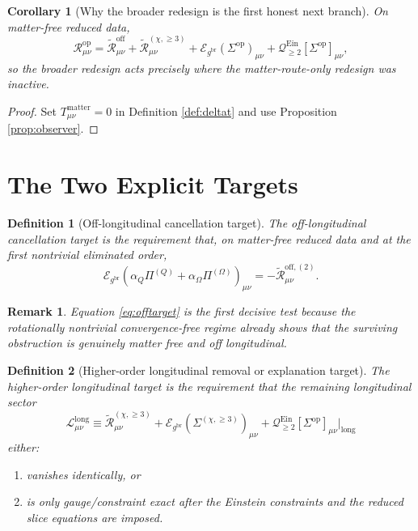\documentclass[11pt]{article}
\newcommand{\ReBridge}{g^{\mathrm{br}}}
\newcommand{\PiQ}{\Pi^{(Q)}}
\newcommand{\PiOmega}{\Pi^{(\Omega)}}
\newcommand{\SigmaOp}{\Sigma^{\mathrm{op}}}
\newcommand{\SigmaLong}{\Sigma^{(\chi,\ge 3)}}
\newcommand{\ReLong}{\widetilde{\mathcal R}_{\mu\nu}^{(\chi,\ge 3)}}
\newcommand{\ReOff}{\widetilde{\mathcal R}_{\mu\nu}^{\mathrm{off}}}
\newcommand{\ReOffTwo}{\widetilde{\mathcal R}_{\mu\nu}^{\mathrm{off},(2)}}
\newcommand{\EinLin}{\mathcal E_{\ReBridge}}
\newcommand{\EinQuad}{\mathcal Q_{\ge 2}^{\mathrm{Ein}}}
\newtheorem{definition}{Definition}
\newtheorem{remark}{Remark}
\newtheorem{corollary}{Corollary}
\begin{document}
\begin{corollary}[Why the broader redesign is the first honest next branch]
\label{cor:honest}
On matter-free reduced data,
\begin{equation}
\mathcal R_{\mu\nu}^{\mathrm{op}}
=
\ReOff+\ReLong
+\EinLin(\SigmaOp)_{\mu\nu}
+\EinQuad[\SigmaOp]_{\mu\nu},
\label{eq:matterfreeobs}
\end{equation}
so the broader redesign acts precisely where the matter-route-only redesign was inactive.
\end{corollary}

\begin{proof}
Set \(T_{\mu\nu}^{\mathrm{matter}}=0\) in Definition \ref{def:deltat} and use Proposition \ref{prop:observer}.
\end{proof}

\section{The Two Explicit Targets}

\begin{definition}[Off-longitudinal cancellation target]
\label{def:offtarget}
The \emph{off-longitudinal cancellation target} is the requirement that, on matter-free reduced data and at the first nontrivial eliminated order,
\begin{equation}
\EinLin(\alpha_Q\PiQ+\alpha_\Omega\PiOmega)_{\mu\nu}
=
-\ReOffTwo.
\label{eq:offtarget}
\end{equation}
\end{definition}

\begin{remark}
Equation \eqref{eq:offtarget} is the first decisive test because the rotationally nontrivial convergence-free regime already shows that the surviving obstruction is genuinely matter free and off longitudinal.
\end{remark}

\begin{definition}[Higher-order longitudinal removal or explanation target]
\label{def:longtarget}
The \emph{higher-order longitudinal target} is the requirement that the remaining longitudinal sector
\begin{equation}
\mathcal L_{\mu\nu}^{\mathrm{long}}
\equiv
\ReLong
+\EinLin(\SigmaLong)_{\mu\nu}
+\EinQuad[\SigmaOp]_{\mu\nu}\Big|_{\mathrm{long}}
\label{eq:longtarget}
\end{equation}
either:
\begin{enumerate}
    \item vanishes identically, or
    \item is only gauge/constraint exact after the Einstein constraints and the reduced slice equations are imposed.
\end{enumerate}
\end{definition}
\end{document}
